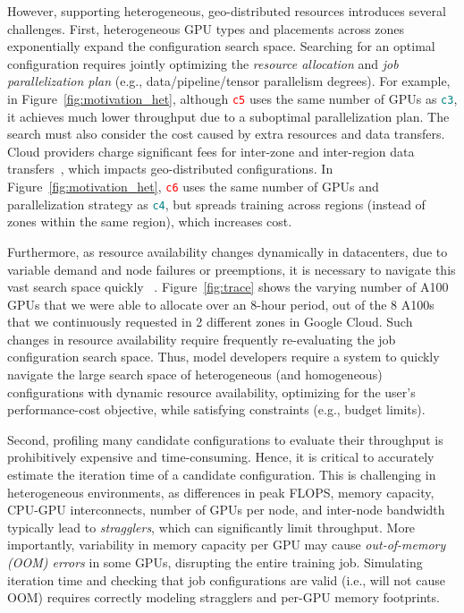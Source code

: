 However, supporting heterogeneous, geo-distributed resources introduces several challenges.
First, heterogeneous GPU types and placements across zones exponentially expand the configuration search space. 
Searching for an optimal configuration requires jointly optimizing the \textit{resource allocation} and \textit{job parallelization plan} (e.g., data/pipeline/tensor parallelism degrees). For example, in Figure~\ref{fig:motivation_het}, although \textcolor{red}{\texttt{c5}} uses the same number of GPUs as \textcolor{teal}{\texttt{c3}}, it achieves much lower throughput due to a suboptimal parallelization plan. 
The search must also consider the cost caused by extra resources and data transfers. Cloud providers charge significant fees for inter-zone and inter-region data transfers~\cite{aws-interzone, gcp-interzone, az-interzone}, which impacts geo-distributed configurations. In Figure~\ref{fig:motivation_het}, \textcolor{red}{\texttt{c6}} uses the same number of GPUs and parallelization strategy as \textcolor{teal}{\texttt{c4}}, but spreads training across regions (instead of zones within the same region), which increases cost. 

Furthermore, as resource availability changes dynamically in datacenters, due to variable demand and node failures or preemptions, it is necessary to navigate this vast search space quickly ~\cite{Thorpe23Bamboo, wagenlander24tenplex}. Figure~\ref{fig:trace} shows the varying number of A100 GPUs that we were able to allocate over an 8-hour period, out of the 8 A100s that we continuously requested in 2 different zones in Google Cloud. Such changes in resource availability require frequently re-evaluating the job configuration search space. Thus, model developers require a system to quickly navigate the large search space of heterogeneous (and homogeneous) configurations with dynamic resource availability, optimizing for the user's performance-cost objective, while satisfying constraints (e.g., budget limits).  


Second, profiling many candidate configurations to evaluate their throughput is prohibitively expensive and time-consuming. Hence, it is critical to accurately estimate the iteration time of a candidate configuration. This is challenging in heterogeneous environments, as differences in peak FLOPS, memory capacity, CPU-GPU interconnects, number of GPUs per node, and inter-node bandwidth typically lead to \textit{stragglers}, which can significantly limit throughput. 
More importantly, variability in memory capacity per GPU may cause \textit{out-of-memory (OOM) errors} in some GPUs, disrupting the entire training job. Simulating iteration time and checking that job configurations are valid (i.e., will not cause OOM) requires correctly modeling stragglers and per-GPU memory footprints.



